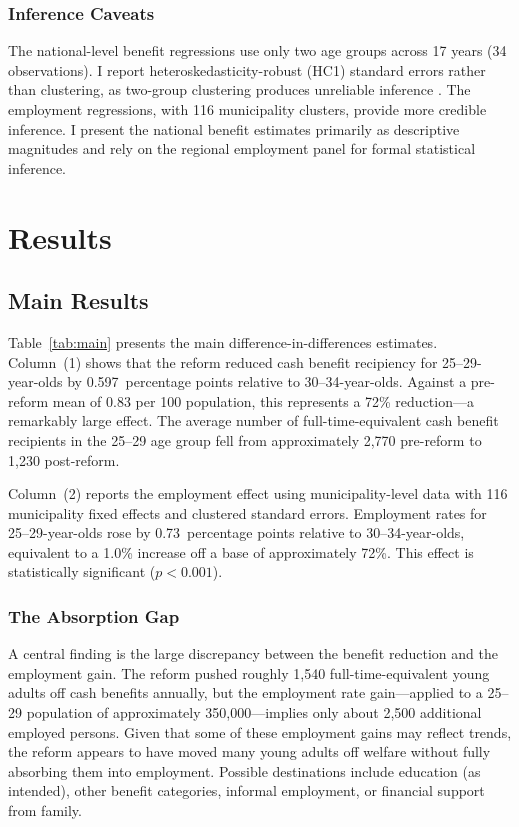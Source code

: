 \documentclass[12pt]{article}
\begin{document}
\subsubsection*{Inference Caveats} The national-level benefit regressions use only two age groups across 17 years (34 observations). I report heteroskedasticity-robust (HC1) standard errors rather than clustering, as two-group clustering produces unreliable inference \citep{cameron2008}. The employment regressions, with 116 municipality clusters, provide more credible inference. I present the national benefit estimates primarily as descriptive magnitudes and rely on the regional employment panel for formal statistical inference.

\section{Results}

\subsection{Main Results}



Table~\ref{tab:main} presents the main difference-in-differences estimates. Column~(1) shows that the reform reduced cash benefit recipiency for 25--29-year-olds by 0.597~percentage points relative to 30--34-year-olds. Against a pre-reform mean of 0.83 per 100 population, this represents a 72\% reduction---a remarkably large effect. The average number of full-time-equivalent cash benefit recipients in the 25--29 age group fell from approximately 2,770 pre-reform to 1,230 post-reform.

Column~(2) reports the employment effect using municipality-level data with 116 municipality fixed effects and clustered standard errors. Employment rates for 25--29-year-olds rose by 0.73~percentage points relative to 30--34-year-olds, equivalent to a 1.0\% increase off a base of approximately 72\%. This effect is statistically significant ($p < 0.001$).

\subsubsection*{The Absorption Gap} A central finding is the large discrepancy between the benefit reduction and the employment gain. The reform pushed roughly 1,540 full-time-equivalent young adults off cash benefits annually, but the employment rate gain---applied to a 25--29 population of approximately 350,000---implies only about 2,500 additional employed persons. Given that some of these employment gains may reflect trends, the reform appears to have moved many young adults off welfare without fully absorbing them into employment. Possible destinations include education (as intended), other benefit categories, informal employment, or financial support from family.
\end{document}
